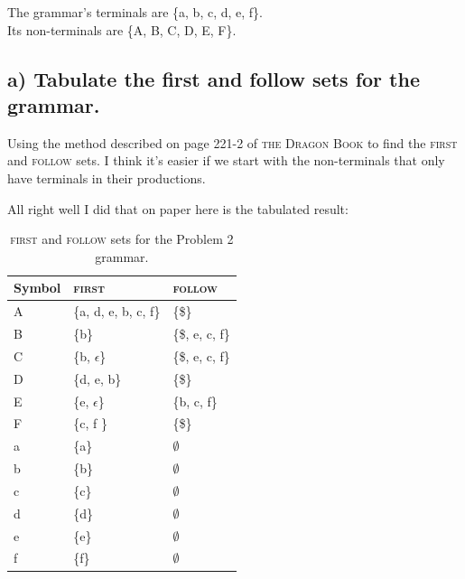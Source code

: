 The grammar's terminals are \{a, b, c, d, e, f\}. \\
Its non-terminals are \{A, B, C, D, E, F\}.

\subsection{a) Tabulate the first and follow sets for the grammar.}
%
Using the method described on page 221-2 of \textsc{the Dragon Book} to find the \textsc{first} and \textsc{follow} sets.
I think it's easier if we start with the non-terminals that only have terminals in their productions.

All right well I did that on paper here is the tabulated result:

\begin{table}[H]
\begin{center}
\begin{tabular}{l|l|l}
\hline
	Symbol	& \textsc{first}		& \textsc{follow} \\ \hline \hline
	A		& \{a, d, e, b, c, f\}	& \{\$\} \\
	B 		& \{b\}					& \{\$, e, c, f\}\\
	C		& \{b, $\epsilon$\}		& \{\$, e, c, f\}\\
	D		& \{d, e, b\}			& \{\$\}\\
	E		& \{e, $\epsilon$\}		& \{b, c, f\}\\
	F		& \{c, f \}				& \{\$\}\\
	a		& \{a\}					& $\emptyset$ \\
	b		& \{b\}					& $\emptyset$\\
	c		& \{c\}					& $\emptyset$\\
	d		& \{d\}					& $\emptyset$\\
	e		& \{e\}					& $\emptyset$\\
	f		& \{f\}					& $\emptyset$\\ \hline
\end{tabular}
\label{tab:2a}
\caption{\textsc{first} and \textsc{follow} sets for the Problem 2 grammar.}
\end{center}
\end{table}

